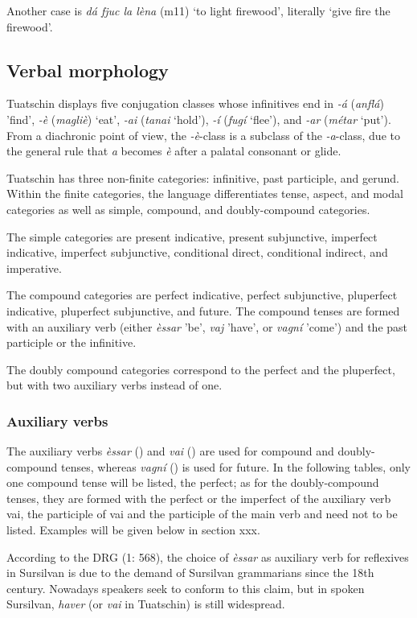 Another case is \textit{dá fjuc la lèna} (m11) `to light firewood', literally `give fire the firewood'.

\subsection{Verbal morphology}
Tuatschin displays five conjugation classes whose infinitives end in \textit{-á} (\textit{anflá}) 'find', \textit{-è} (\textit{magliè}) `eat', \textit{-ai} (\textit{tanai} `hold'), \textit{-í} (\textit{fugí} `flee'), and \textit{-ar} (\textit{métar} `put').  From a diachronic point of view, the \textit{-è}-class is a subclass of the \textit{-a}-class, due to the general rule that \textit{a} becomes \textit{è} after a palatal consonant or glide.

Tuatschin has three non-finite categories: infinitive, past participle, and gerund.  Within the finite categories, the language differentiates tense, aspect, and modal categories as well as simple,  compound, and doubly-compound categories.

The simple categories are present indicative, present subjunctive, imperfect indicative, imperfect subjunctive, conditional direct, conditional indirect, and imperative.

The compound categories are perfect indicative, perfect subjunctive, pluperfect indicative,  pluperfect subjunctive, and future. The compound tenses are formed with an auxiliary verb (either \textit{èssar} 'be', \textit{vaj} 'have', or \textit{vagní} 'come') and the past participle or the infinitive. 

The doubly compound categories correspond to the perfect and the pluperfect,
but with two auxiliary verbs instead of one.


\subsubsection{Auxiliary verbs}
The auxiliary verbs \textit{èssar} () and \textit{vai} () are used for compound and doubly-compound tenses, whereas \textit{vagní} () is used for future. In the following tables, only one compound tense will be listed, the perfect; as for the doubly-compound tenses, they are formed with the perfect or the imperfect of the auxiliary verb vai, the participle of vai and the participle of the main verb and need not to be listed. Examples will be given below in section xxx. 

According to the DRG (1: 568), the choice of \textit{èssar} as auxiliary verb for reflexives in Sursilvan is due to the demand of Sursilvan grammarians since the 18th century. Nowadays speakers seek to conform to this claim, but in spoken Sursilvan, \textit{haver} (or \textit{vai} in Tuatschin) is still widespread.

